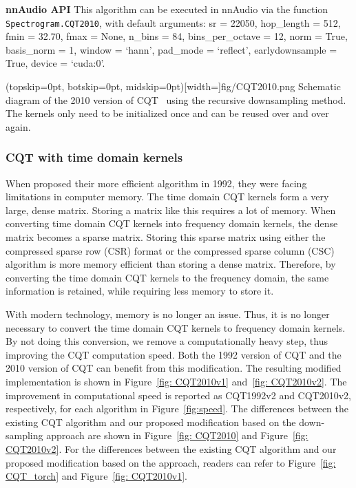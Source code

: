 \documentclass{ieeeaccess}
\newcommand{\nbh}[1]{\texttt{#1}}
\begin{document}
\hspace{11pt} 

\noindent \textbf{nnAudio API} This algorithm can be executed in nnAudio via the function \nbh{Spectrogram.CQT2010}, with default arguments: sr = 22050, hop\_length = 512, fmin = 32.70, fmax = None, n\_bins = 84, bins\_per\_octave = 12, norm = True, basis\_norm = 1, window = `hann', pad\_mode = `reflect', earlydownsample = True, device = `cuda:0'.

\Figure(topskip=0pt, botskip=0pt, midskip=0pt)[width=\linewidth]{fig/CQT2010.png}
{Schematic diagram of the 2010 version of CQT~\cite{schorkhuber2010constant, brown1991calculation} using the recursive downsampling method. The kernels  only need to be initialized once and can be reused over and over again. \label{fig: CQT2010}}




\subsubsection{CQT with time domain kernels}
\label{subsec:CQTv2}
When \citet{brown1992efficient} proposed their more efficient algorithm in 1992, they were facing limitations in computer memory. The time domain CQT kernels form a very large, dense matrix. Storing a matrix like this requires a lot of memory. When converting time domain CQT kernels into frequency domain kernels, the dense matrix becomes a sparse matrix. Storing this sparse matrix using either the compressed sparse row (CSR) format or the compressed sparse column (CSC) algorithm is more memory efficient than storing a dense matrix. Therefore, by converting the time domain CQT kernels to the frequency domain, the same information is retained, while requiring less memory to store it.

With modern technology, memory is no longer an issue. Thus, it is no longer necessary to convert the time domain CQT kernels to frequency domain kernels. By not doing this conversion, we remove a computationally heavy step, thus improving the CQT computation speed. Both the 1992 version of CQT and the 2010 version of CQT can benefit from this modification. The resulting modified implementation is shown in Figure~\ref{fig: CQT2010v1} and~\ref{fig: CQT2010v2}. The improvement in computational speed is reported as CQT1992v2 and CQT2010v2, respectively, for each algorithm in Figure~\ref{fig:speed}. {The differences between the existing CQT algorithm and our proposed modification based on the down-sampling approach are shown in Figure~\ref{fig: CQT2010} and Figure~\ref{fig: CQT2010v2}. For the differences between the existing CQT algorithm and our proposed modification based on the \citet{brown1992efficient} approach, readers can refer to Figure~\ref{fig: CQT_torch} and Figure~\ref{fig: CQT2010v1}.}
\end{document}
